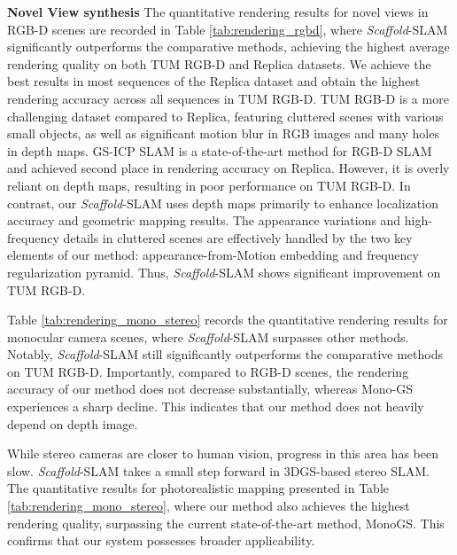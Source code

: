 \noindent\textbf{Novel View synthesis }
The quantitative rendering results for novel views in RGB-D scenes are recorded in Table \ref{tab:rendering_rgbd}, where \emph{Scaffold}-SLAM significantly outperforms the comparative methods, achieving the highest average rendering quality on both TUM RGB-D and Replica datasets. We achieve the best results in most sequences of the Replica dataset and obtain the highest rendering accuracy across all sequences in TUM RGB-D. TUM RGB-D is a more challenging dataset compared to Replica, featuring cluttered scenes with various small objects, as well as significant motion blur in RGB images and many holes in depth maps. GS-ICP SLAM is a state-of-the-art method for RGB-D SLAM and achieved second place in rendering accuracy on Replica. However, it is overly reliant on depth maps, resulting in poor performance on TUM RGB-D. In contrast, our \emph{Scaffold}-SLAM uses depth maps primarily to enhance localization accuracy and geometric mapping results. The appearance variations and high-frequency details in cluttered scenes are effectively handled by the two key elements of our method: appearance-from-Motion embedding and frequency regularization pyramid. Thus, \emph{Scaffold}-SLAM shows significant improvement on TUM RGB-D.

Table \ref{tab:rendering_mono_stereo} records the quantitative rendering results for monocular camera scenes, where \emph{Scaffold}-SLAM surpasses other methods. Notably, \emph{Scaffold}-SLAM still significantly outperforms the comparative methods on TUM RGB-D. Importantly, compared to RGB-D scenes, the rendering accuracy of our method does not decrease substantially, whereas Mono-GS experiences a sharp decline. This indicates that our method does not heavily depend on depth image.

While stereo cameras are closer to human vision, progress in this area has been slow. \emph{Scaffold}-SLAM takes a small step forward in 3DGS-based stereo SLAM. The quantitative results for photorealistic mapping presented in Table \ref{tab:rendering_mono_stereo}, where our method also achieves the highest rendering quality, surpassing the current state-of-the-art method, MonoGS. This confirms that our system possesses broader applicability.

